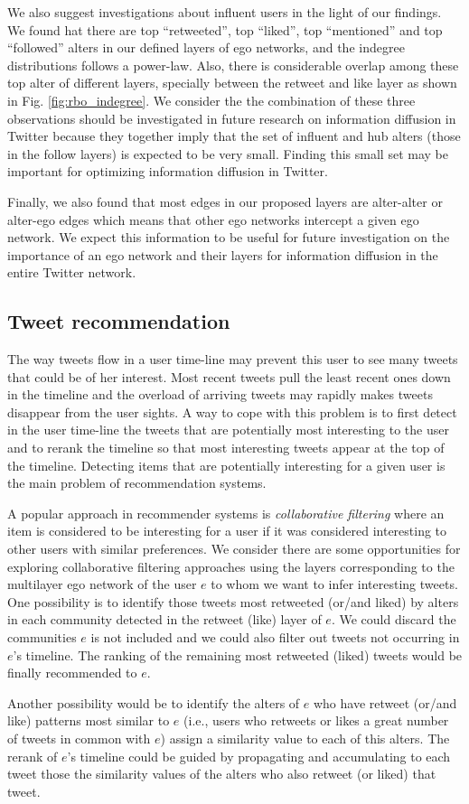 We also suggest investigations about influent users in the light of our findings. We found hat there  are top ``retweeted'', top ``liked'', top ``mentioned'' and top ``followed'' alters in our defined layers of ego networks, and the indegree distributions follows  a power-law. Also, there is considerable overlap among these top alter of different layers, specially between the retweet and like layer as shown in Fig. \ref{fig:rbo_indegree}. We consider the the combination of these  three observations should  be investigated in future research on information diffusion in Twitter because they together imply that the set of influent and hub alters (those in the follow layers) is expected to be very small. Finding this small set may be  important for optimizing information diffusion in Twitter.

Finally, we also found that most edges in our proposed layers are alter-alter or alter-ego  edges which means that other ego networks intercept a given ego network. We expect this information to be useful for future investigation on  the importance of an ego network and their layers for information diffusion in the  entire Twitter network. 

\subsection*{Tweet recommendation}
The way tweets flow in a user time-line may prevent this user to see many tweets that could be of her interest. Most recent tweets pull the least recent ones down in the timeline and the overload of arriving tweets may rapidly makes tweets disappear from the user sights. A way to cope with this problem is to first detect in the user time-line the tweets that are potentially most interesting to the user and to rerank the timeline so that most interesting tweets appear at the top of the timeline. Detecting items that are potentially interesting for a given user is the main problem of recommendation systems.

A popular approach in recommender systems is {\em collaborative filtering} where an item is considered to be interesting for a  user if it was considered interesting to other users with similar preferences. We consider there are  some opportunities for exploring collaborative filtering approaches using the layers corresponding to the multilayer ego network of the user  $e$ to whom we want to infer interesting tweets. One possibility is to identify those tweets most retweeted (or/and liked) by alters in each community detected in the retweet (like) layer of $e$. We could discard the communities $e$ is not included and we could also filter out tweets not occurring in $e$'s timeline. The ranking of the remaining most retweeted (liked) tweets would be  finally recommended to  $e$.  

Another possibility would be to  identify the alters of $e$ who have retweet (or/and like) patterns most similar to $e$ (i.e., users who retweets or likes a great number of tweets in common with $e$) assign a similarity value to each of this alters. The rerank of  $e$'s timeline could be guided by propagating and accumulating to each tweet those the similarity values of the alters who also retweet (or liked) that tweet. 

